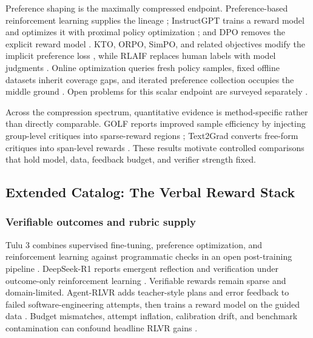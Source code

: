 Preference shaping is the maximally compressed endpoint. Preference-based reinforcement learning supplies the lineage \citep{christiano2017deep}; InstructGPT trains a reward model and optimizes it with proximal policy optimization \citep{ouyang2022training,schulman2017proximal,stiennon2020learning}; and DPO removes the explicit reward model \citep{rafailov2023direct}. KTO, ORPO, SimPO, and related objectives modify the implicit preference loss \citep{ethayarajh2024kto,hong2024orpo,meng2024simpo,azar2024general}, while RLAIF replaces human labels with model judgments \citep{lee2023rlaif}. Online optimization queries fresh policy samples, fixed offline datasets inherit coverage gaps, and iterated preference collection occupies the middle ground \citep{yuan2024self}. Open problems for this scalar endpoint are surveyed separately \citep{casper2023open}.

Across the compression spectrum, quantitative evidence is method-specific rather than directly comparable. GOLF reports improved sample efficiency by injecting group-level critiques into sparse-reward regions \citep{huang2026bootstrapping}; Text2Grad converts free-form critiques into span-level rewards \citep{wang2026text2gradreinforcementlearningnatural}. These results motivate controlled comparisons that hold model, data, feedback budget, and verifier strength fixed.

\subsection{Extended Catalog: The Verbal Reward Stack}
\label{supp:sec:reward-stack}

\subsubsection{Verifiable outcomes and rubric supply}
\label{supp:subsec:reward-verifiable-rubric}

Tulu 3 combines supervised fine-tuning, preference optimization, and reinforcement learning against programmatic checks in an open post-training pipeline \citep{lambert2024tulu}. DeepSeek-R1 reports emergent reflection and verification under outcome-only reinforcement learning \citep{guo2025deepseek}. Verifiable rewards remain sparse and domain-limited. Agent-RLVR adds teacher-style plans and error feedback to failed software-engineering attempts, then trains a reward model on the guided data \citep{da2025agentrlvr}. Budget mismatches, attempt inflation, calibration drift, and benchmark contamination can confound headline RLVR gains \citep{wu2025position}.

